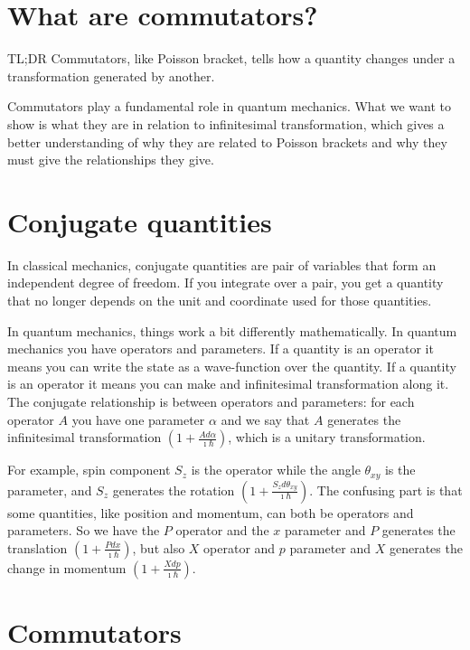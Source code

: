 \documentclass[aps,pra,10pt,floatfix,nofootinbib]{revtex4-1}
\theoremstyle{definition}
\begin{document}
\section{What are commutators?}

TL;DR Commutators, like Poisson bracket, tells how a quantity changes under a transformation generated by another.

Commutators play a fundamental role in quantum mechanics. What we want to show is what they are in relation to infinitesimal transformation, which gives a better understanding of why they are related to Poisson brackets and why they must give the relationships they give.

\section{Conjugate quantities}

In classical mechanics, conjugate quantities are pair of variables that form an independent degree of freedom. If you integrate over a pair, you get a quantity that no longer depends on the unit and coordinate used for those quantities.

In quantum mechanics, things work a bit differently mathematically. In quantum mechanics you have operators and parameters. If a quantity is an operator it means you can write the state as a wave-function over the quantity. If a quantity is an operator it means you can make and infinitesimal transformation along it. The conjugate relationship is between operators and parameters: for each operator $A$ you have one parameter $\alpha$ and we say that $A$ generates the infinitesimal transformation $(1 + \frac{A d\alpha}{\imath \hbar})$, which is a unitary transformation.

For example, spin component $S_z$ is the operator while the angle $\theta_{xy}$ is the parameter, and $S_z$ generates the rotation $(1 + \frac{S_z d\theta_{xy}}{\imath \hbar})$. The confusing part is that some quantities, like position and momentum, can both be operators and parameters. So we have the $P$ operator and the $x$ parameter and $P$ generates the translation $(1 + \frac{P dx}{\imath \hbar})$, but also $X$ operator and $p$ parameter and $X$ generates the change in momentum $(1 + \frac{X dp}{\imath \hbar})$.

\section{Commutators}
\end{document}
